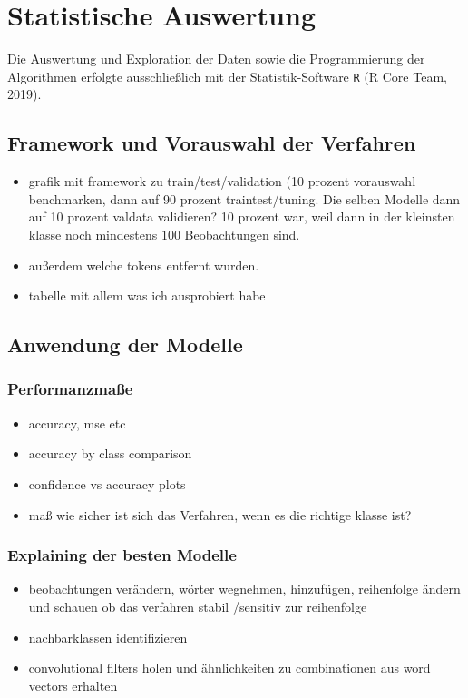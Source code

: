 \documentclass[a4paper,11pt]{article}
\begin{document}
\section{Statistische Auswertung}\label{Kap:statAus}

Die Auswertung und Exploration der Daten sowie die Programmierung der Algorithmen erfolgte ausschließlich mit der Statistik-Software \texttt{R} (R Core Team, 2019).

\subsection{Framework und Vorauswahl der Verfahren}

\begin{itemize}
    \item grafik mit framework zu train/test/validation (10 prozent vorauswahl benchmarken, dann auf 90 prozent traintest/tuning. Die selben Modelle dann auf 10 prozent valdata validieren? 10 prozent war, weil dann in der kleinsten klasse noch mindestens $100$ Beobachtungen sind.
    \item außerdem welche tokens entfernt wurden.
    \item tabelle mit allem was ich ausprobiert habe
\end{itemize}{}

\subsection{Anwendung der Modelle}
\subsubsection{Performanzmaße}

\begin{itemize}
    \item accuracy, mse etc
    \item accuracy by class comparison
    \item confidence vs accuracy plots
    \item maß wie sicher ist sich das Verfahren, wenn es die richtige klasse ist?
\end{itemize}{}

\subsubsection{Explaining der besten Modelle}

\begin{itemize}
    \item beobachtungen verändern, wörter wegnehmen, hinzufügen, reihenfolge ändern und schauen ob das verfahren stabil /sensitiv zur reihenfolge
    \item nachbarklassen identifizieren
    \item convolutional filters holen und ähnlichkeiten zu combinationen aus word vectors erhalten
\end{itemize}{}
\end{document}
